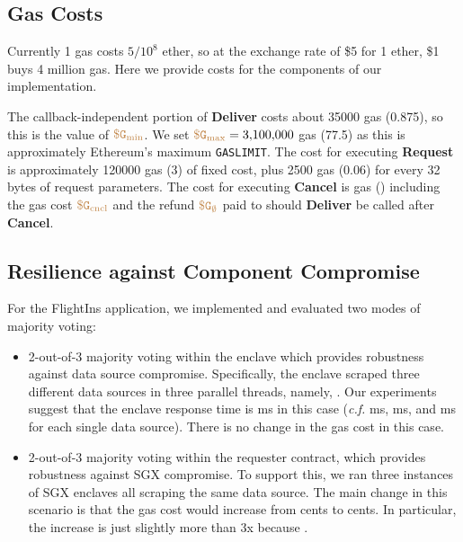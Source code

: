 \subsection{Gas Costs}
Currently 1 gas costs $5 / 10^8$ ether, so at the exchange rate of \$5 for 1 ether, \$1 buys 4 million gas.
Here we provide costs for the components of our implementation.

The callback-independent portion of {\bf Deliver} costs about \num[group-separator={,}]{35000} gas (0.875\textcent), so this is the value of $\constgasmin$.
We set $\constgasmax = \num[group-separator={,}]{3100000}$ gas (77.5\textcent) as this is approximately Ethereum's maximum {\tt GASLIMIT}.
The cost for executing {\bf Request} is approximately \num[group-separator={,}]{120000} gas (3\textcent) of fixed cost, 
plus \num[group-separator={,}]{2500} gas (0.06\textcent) for every 32 bytes of request parameters.
The cost for executing {\bf Cancel} is  gas (\textcent)
including the gas cost $\constgasinvokecancel$ and the refund $\constgascancel$ paid to \tcs should {\bf Deliver} be called after {\bf Cancel}.




\subsection{Resilience against Component Compromise}
For the {\sf FlightIns} application, 
we implemented and evaluated two modes of majority voting:
\begin{itemize}[leftmargin=3mm]
\item
2-out-of-3 majority voting within the enclave which provides robustness
against data source compromise.
Specifically, the enclave scraped three different data sources in three parallel threads, 
namely, .
Our experiments suggest that  
the enclave response time is 
 ms in this case ({\it c.f.}  ms, 
 ms, and  ms for 
each single data source).
There is no change in the gas cost in this case.
\item
2-out-of-3 majority voting within the requester contract,
which provides robustness against 
SGX compromise.
To support this, we ran three instances of SGX enclaves all scraping
the same data source.  
The main change in this scenario is that 
the gas cost would increase from
 cents 
to  cents.
In particular, the increase is just slightly more than 3x 
because .
\end{itemize}


